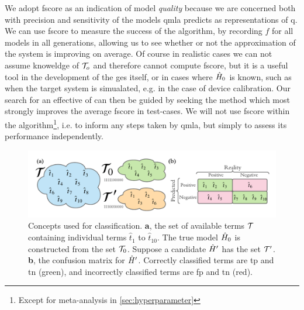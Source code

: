 We adopt \gls{fscore} as an indication of model \emph{quality} because we are concerned both with precision and sensitivity
    of the models \gls{qmla} predicts as representations of \gls{q}. 
We can use \gls{fscore} to measure the success of the algorithm,
    by recording $f$ for all models in all generations, allowing us to 
    see whether or not the approximation of the system is improving on average. 
Of course in realistic cases we can not assume knoweldge of $\mathcal{T}_o$ and therefore cannot compute 
    \gls{fscore}, but it is a useful tool in the development of the \gls{ges} itself, 
    or in cases where $\hat{H}_0$ is known, such as when the target system is simualated, e.g. in the case of device calibration.
Our search for an effective \gls{of} can then be guided by seeking the 
    method which most strongly improves the average \gls{fscore} in test-cases.
We will not use \gls{fscore} within the algorithm\footnote{Except for meta-analysis in \cref{sec:hyperparameter}}, 
    i.e. to inform any steps taken by \gls{qmla}, but simply to assess its performance independently.

\begin{figure}
    \begin{center}
        \includegraphics[width=\textwidth]{theoretical_study/figures/classication_example.pdf}
    \end{center}
    \caption[Classification concepts]{
        Concepts used for classification. 
        \textbf{a}, the set of available terms $\mathcal{T}$ containing individual terms $\hat{t}_1$ to $\hat{t}_{10}$. 
        The \gls{true model} $\hat{H}_0$ is constructed from the set $\mathcal{T}_0$. 
        Suppose a candidate $\hat{H}^{\prime}$ has the set $\mathcal{T}^{\prime}$. 
        \textbf{b}, the confusion matrix for $\hat{H}^{\prime}$. Correctly classified terms are \acrlong{tp} and \acrlong{tn} (green), 
            and incorrectly classified terms are \acrlong{fp} and \acrlong{tn} (red). 
    }
    \label{fig:classification_eg}
\end{figure}



